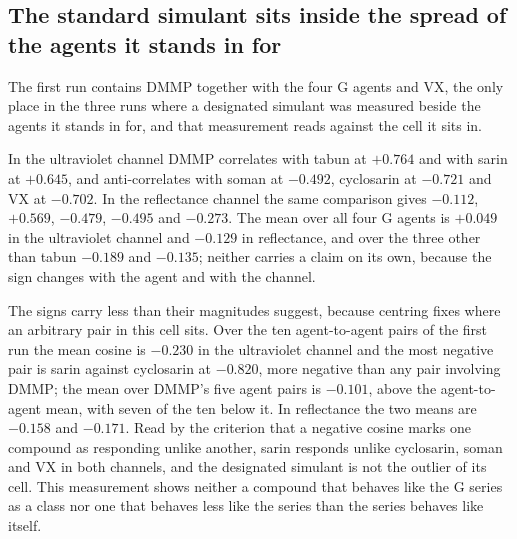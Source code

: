 \documentclass[journal=jacsat,manuscript=article,margin=1in]{achemso}
\begin{document}
\subsection{The standard simulant sits inside the spread of the agents it
stands in for}
\label{res:dmmp}

The first run contains DMMP together with the four G agents and VX, the only
place in the three runs where a designated simulant was measured beside the
agents it stands in for, and that measurement reads against the cell it sits
in.

In the ultraviolet channel DMMP correlates with tabun at $+0.764$ and with
sarin at $+0.645$, and anti-correlates with soman at $-0.492$, cyclosarin
at $-0.721$ and VX at $-0.702$. In the reflectance channel the same
comparison gives $-0.112$, $+0.569$, $-0.479$, $-0.495$ and $-0.273$. %
The mean
over all four G agents is $+0.049$ in the ultraviolet channel and $-0.129$ in
reflectance, and over the three other than tabun $-0.189$ and $-0.135$;
neither carries a claim on its own, because the sign changes with the agent and
with the channel.

The signs carry less than their magnitudes suggest, because centring fixes
where an arbitrary pair in this cell sits. Over the ten agent-to-agent pairs of
the first run the mean cosine is $-0.230$ in the ultraviolet channel and the
most negative pair is sarin against cyclosarin at $-0.820$, more negative than
any pair involving DMMP; the mean over DMMP's five agent pairs is $-0.101$,
above the agent-to-agent mean, with seven of the ten below it. In reflectance
the two means are $-0.158$ and $-0.171$. Read by the criterion that a negative
cosine marks one compound as responding unlike another, sarin responds unlike
cyclosarin, soman and VX in both channels, and the designated simulant is not
the outlier of its cell. This measurement shows neither a compound that
behaves like the G series as a class nor one that behaves less like the series
than the series behaves like itself.
\end{document}
